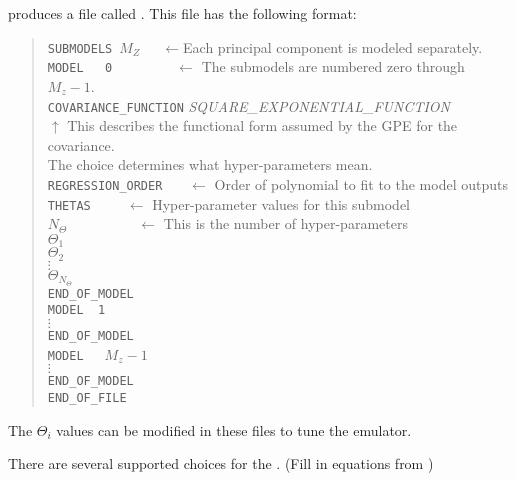  produces a file called . This file has the following format:
\begin{quote}
{\tt SUBMODELS}~$M_Z$~~~$\leftarrow$Each principal component is modeled separately.\\
{\tt MODEL~~~0}~~~~~~~~~$\leftarrow$ The submodels are numbered zero through $M_z-1$.\\
{\tt COVARIANCE\_FUNCTION} {\it SQUARE\_EXPONENTIAL\_FUNCTION}\\
$\uparrow$ This describes the  functional form assumed by the GPE for the covariance.\\
The choice determines what hyper-parameters mean.\\
{\tt REGRESSION\_ORDER }~~ $\leftarrow$ Order of polynomial to fit to the model outputs\\
{\tt THETAS}~~~~~$\leftarrow$ Hyper-parameter values for this submodel\\
$N_\Theta$~~~~~~~~~~$\leftarrow$ This is the number of hyper-parameters\\
$\Theta_1$\\
$\Theta_2$\\
$\vdots$\\
$\Theta_{N_\Theta}$\\
{\tt END\_OF\_MODEL}\\
{\tt MODEL~~1}\\
$\vdots$\\
{\tt END\_OF\_MODEL}\\
{\tt MODEL}~~~{$M_z-1$}\\
$\vdots$\\
{\tt END\_OF\_MODEL}\\
{\tt END\_OF\_FILE}
\end{quote}\vspace*{-8pt}

The $\Theta_i$ values can be modified in these files to tune the emulator.

There are several supported choices for the . (Fill in equations from )

\begin{description}

\item {}



\item {}

\item {}

\item {}

\end{description}
